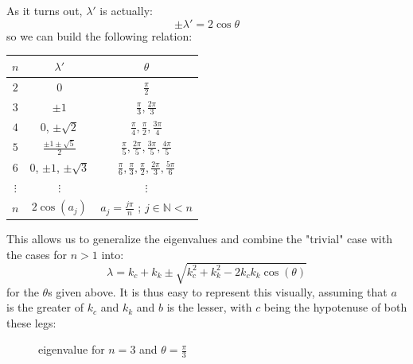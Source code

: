 \documentclass[11pt]{article}
\begin{document}
As it turns out, $\lambda'$ is actually:
\[
\pm \lambda' = 2\cos\theta
\]
so we can build the following relation:
\begin{center}
	\begin{tabular}{ c | c | c}
		$n$ & $\lambda'$  & $\theta$\\
		\hline
		$2$ & $0$  & $\frac{\pi}{2}$\\
		$3$ & $\pm 1$ & $\frac{\pi}{3}, \frac{2 \pi}{3}$ \\
		$4$ & $0$, $\pm \sqrt{2}$ & $\frac{\pi}{4}, \frac{\pi}{2}, \frac{3\pi}{4}$\\
		$5$ & $\frac{\pm 1 \pm \sqrt{5}}{2}$ & $\frac{\pi}{5}, \frac{2\pi}{5}, \frac{3\pi}{5},\frac{4\pi}{5}$\\
		$6$ & $0$, $\pm 1$, $\pm \sqrt{3}$ &$\frac{\pi}{6}, \frac{\pi}{3}, \frac{\pi}{2}, \frac{2\pi}{3}, \frac{5\pi}{6}$\\
		$\vdots$ & $\vdots$ & $\vdots$\\
		$n$ & $2\cos(a_j)$ & $a_j = \frac{j \pi}{n}$ ; $j \in \mathbb{N} < n$
	\end{tabular}
\end{center}

This allows us to generalize the eigenvalues and combine the "trivial" case with the cases for $n>1$ into:
\[
\lambda = k_c + k_k \pm \sqrt{k_c^2 + k_k^2 - 2 k_c k_k \cos(\theta)}
\]
for the $\theta$s given above. It is thus easy to represent this visually, assuming that $a$ is the greater of $k_c$ and $k_k$ and $b$ is the lesser, with $c$ being the hypotenuse of both these legs:
\begin{figure}[H]
\begin{center}
\end{center}
\caption{eigenvalue for $n=3$ and $\theta = \frac{\pi}{3}$}
\end{figure}
\end{document}
